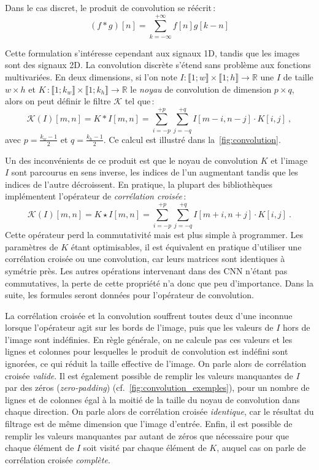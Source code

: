 Dans le cas discret, le produit de convolution se réécrit\,:
\begin{equation}
  (f * g)[n] = \sum_{k=-\infty}^{+\infty} f[n]g[k-n]
\end{equation}

Cette formulation s'intéresse cependant aux signaux 1D, tandis que les images sont des signaux 2D. La convolution discrète s'étend sans problème aux fonctions multivariées. En deux dimensions, si l'on note $I : \llbracket 1;w \rrbracket \times \llbracket 1;h \rrbracket \rightarrow \mathbb{R}$ une $I$ de taille $w\times{}h$ et $K\,: \llbracket 1;k_w \rrbracket \times \llbracket 1;k_h \rrbracket \rightarrow \mathbb{R}$ le \emph{noyau} de convolution de dimension $p \times q$, alors on peut définir le filtre $\mathcal{K}$ tel que\,:
\begin{equation}
  \mathcal{K}(I)[m,n] = K * I [m,n] = \sum_{i=-p}^{+p} \sum_{j=-q}^{+q} I[m - i, n - j] \cdot K[i, j]~,
\end{equation}
avec $p = \frac{k_w-1}{2}$ et $q = \frac{k_h-1}{2}$. Ce calcul est illustré dans la~\cref{fig:convolution}.

Un des inconvénients de ce produit est que le noyau de convolution $K$ et l'image $I$ sont parcourus en sens inverse, les indices de l'un augmentant tandis que les indices de l'autre décroissent. En pratique, la plupart des bibliothèques implémentent l'opérateur de \emph{corrélation croisée}\,:
\begin{equation}
\mathcal{K}(I)[m,n] = K \star I [m, n] = \sum_{i=-p}^{+p} \sum_{j=-q}^{+q} I[m + i, n + j] \cdot K[i, j]~.
\end{equation}
Cette opérateur perd la commutativité mais est plus simple à programmer. Les paramètres de $K$ étant optimisables, il est équivalent en pratique d'utiliser une corrélation croisée ou une convolution, car leurs matrices sont identiques à symétrie près. Les autres opérations intervenant dans des \gls{CNN} n'étant pas commutatives, la perte de cette propriété n'a donc que peu d'importance. Dans la suite, les formules seront données pour l'opérateur de convolution.

La corrélation croisée et la convolution souffrent toutes deux d'une inconnue lorsque l'opérateur agit sur les bords de l'image, puis que les valeurs de $I$ hors de l'image sont indéfinies. En règle générale, on ne calcule pas ces valeurs et les lignes et colonnes pour lesquelles le produit de convolution est indéfini sont ignorées, ce qui réduit la taille effective de l'image. On parle alors de corrélation croisée \emph{valide}. Il est également possible de remplir les valeurs manquantes de $I$ par des zéros (\emph{zero-padding}) (cf.~\cref{fig:convolution_exemples}), pour un nombre de lignes et de colonnes égal à la moitié de la taille du noyau de convolution dans chaque direction. On parle alors de corrélation croisée \emph{identique}, car le résultat du filtrage est de même dimension que l'image d'entrée. Enfin, il est possible de remplir les valeurs manquantes par autant de zéros que nécessaire pour que chaque élément de $I$ soit visité par chaque élément de $K$, auquel cas on parle de corrélation croisée \emph{complète}.

